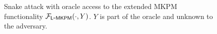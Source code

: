 \begin{figure}[h]
    \centering
    \vspace{0pt}
	
    \caption{Snake attack with oracle access to the extended MKPM functionality $\mathcal{F}_{\mathsf{L\mbox{-}MKPM}}(\cdot, Y)$. $Y$ is part of the oracle and unknown to the adversary.\label{fig:snakeattack}\label{fig:snakeencode1}\label{fig:snakedecode1}} 
\end{figure}
